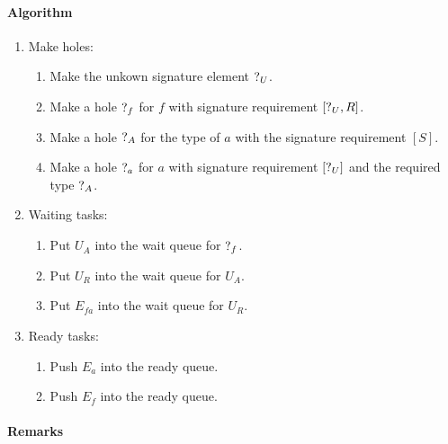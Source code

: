 \paragraph{Algorithm}
\begin{enumerate}
    \item Make holes:
        \begin{enumerate}
            \item Make the unkown signature element ${?_{U}}$.

            \item Make a hole ${?_{f}}$ for $f$ with signature requirement $[{?_{U}}, R]$.

            \item Make a hole ${?_{A}}$ for the type of $a$ with the signature
                requirement $[S]$.

            \item Make a hole ${?_{a}}$ for $a$ with signature requirement $[{?_{U}}]$
                and the
                required type ${?_{A}}$.
        \end{enumerate}

    \item Waiting tasks:
        \begin{enumerate}
            \item Put $U_{A}$ into the wait queue for ${?_{f}}$.

            \item Put $U_R$ into the wait queue for $U_A$.

            \item Put $E_{fa}$ into the wait queue for $U_R$.
        \end{enumerate}

    \item Ready tasks:
        \begin{enumerate}
            \item Push $E_a$ into the ready queue.

            \item Push $E_f$ into the ready queue.
        \end{enumerate}
\end{enumerate}


\paragraph{Remarks}

